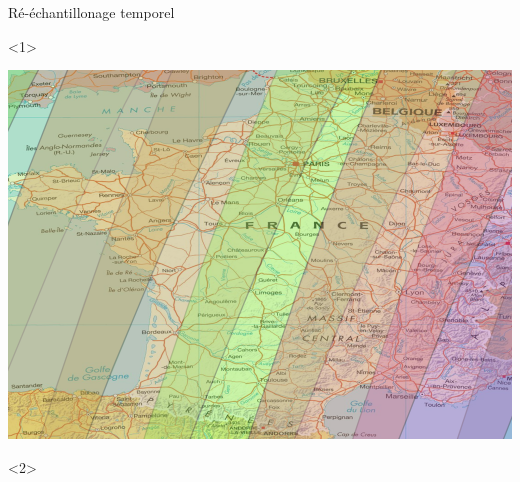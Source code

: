 \documentclass[pressentation,10pt,aspectratio=1610, xcolor=table]{beamer}
\begin{document}
\begin{frame}[label={sec:org2e50dd0}]{Ré-échantillonage temporel}
\begin{onlyenv}<1>
\begin{center}
\begin{center}
\includegraphics[width=0.725\linewidth]{./figures/S2_tracks.png}
\end{center}
\end{center}
\end{onlyenv}
\begin{onlyenv}<2>
\end{onlyenv}
\end{frame}
\end{document}
